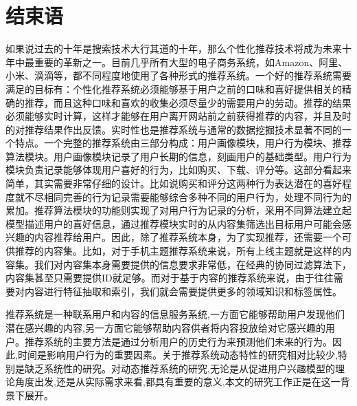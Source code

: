 
\chapter{结束语}
  如果说过去的十年是搜索技术大行其道的十年，那么个性化推荐技术将成为未来十年中最重要的革新之一。目前几乎所有大型的电子商务系统，如Amazon、阿里、小米、滴滴等，都不同程度地使用了各种形式的推荐系统。一个好的推荐系统需要满足的目标有：个性化推荐系统必须能够基于用户之前的口味和喜好提供相关的精确的推荐，而且这种口味和喜欢的收集必须尽量少的需要用户的劳动。推荐的结果必须能够实时计算，这样才能够在用户离开网站前之前获得推荐的内容，并且及时的对推荐结果作出反馈。实时性也是推荐系统与通常的数据挖掘技术显著不同的一个特点。一个完整的推荐系统由三部分构成：用户画像模块，用户行为模块、推荐算法模块。用户画像模块记录了用户长期的信息，刻画用户的基础类型。用户行为模块负责记录能够体现用户喜好的行为，比如购买、下载、评分等。这部分看起来简单，其实需要非常仔细的设计。比如说购买和评分这两种行为表达潜在的喜好程度就不尽相同完善的行为记录需要能够综合多种不同的用户行为，处理不同行为的累加。推荐算法模块的功能则实现了对用户行为记录的分析，采用不同算法建立起模型描述用户的喜好信息，通过推荐模块实时的从内容集筛选出目标用户可能会感兴趣的内容推荐给用户。因此，除了推荐系统本身，为了实现推荐，还需要一个可供推荐的内容集。比如，对于手机主题推荐系统来说，所有上线主题就是这样的内容集。我们对内容集本身需要提供的信息要求非常低，在经典的协同过滤算法下，内容集甚至只需要提供ID就足够。而对于基于内容的推荐系统来说，由于往往需要对内容进行特征抽取和索引，我们就会需要提供更多的领域知识和标签属性。

  推荐系统是一种联系用户和内容的信息服务系统,一方面它能够帮助用户发现他们潜在感兴趣的内容,另一方面它能够帮助内容供者将内容投放给对它感兴趣的用户。推荐系统的主要方法是通过分析用户的历史行为来预测他们未来的行为。因此,时间是影响用户行为的重要因素。关于推荐系统动态特性的研究相对比较少,特别是缺乏系统性的研究。对动态推荐系统的研究,无论是从促进用户兴趣模型的理论角度出发,还是从实际需求来看,都具有重要的意义,本文的研究工作正是在这一背景下展开。

